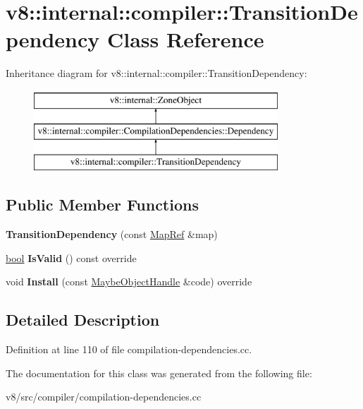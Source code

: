 \hypertarget{classv8_1_1internal_1_1compiler_1_1TransitionDependency}{}\section{v8\+:\+:internal\+:\+:compiler\+:\+:Transition\+Dependency Class Reference}
\label{classv8_1_1internal_1_1compiler_1_1TransitionDependency}
Inheritance diagram for v8\+:\+:internal\+:\+:compiler\+:\+:Transition\+Dependency\+:\begin{figure}[H]
\begin{center}
\leavevmode
\includegraphics[height=3.000000cm]{classv8_1_1internal_1_1compiler_1_1TransitionDependency}
\end{center}
\end{figure}
\subsection*{Public Member Functions}
\begin{DoxyCompactItemize}
\item 
\mbox{\label{classv8_1_1internal_1_1compiler_1_1TransitionDependency_af73899de0142d99551708d9f4eb75c60}} 
{\bfseries Transition\+Dependency} (const \mbox{\hyperlink{classv8_1_1internal_1_1compiler_1_1MapRef}{Map\+Ref}} \&map)
\item 
\mbox{\label{classv8_1_1internal_1_1compiler_1_1TransitionDependency_a65a773b8aecd3d853af6ab3549618323}} 
\mbox{\hyperlink{classbool}{bool}} {\bfseries Is\+Valid} () const override
\item 
\mbox{\label{classv8_1_1internal_1_1compiler_1_1TransitionDependency_aebb25e2c1635aed417d25370bb6387ea}} 
void {\bfseries Install} (const \mbox{\hyperlink{classv8_1_1internal_1_1MaybeObjectHandle}{Maybe\+Object\+Handle}} \&code) override
\end{DoxyCompactItemize}


\subsection{Detailed Description}


Definition at line 110 of file compilation-\/dependencies.\+cc.



The documentation for this class was generated from the following file\+:\begin{DoxyCompactItemize}
\item 
v8/src/compiler/compilation-\/dependencies.\+cc\end{DoxyCompactItemize}
